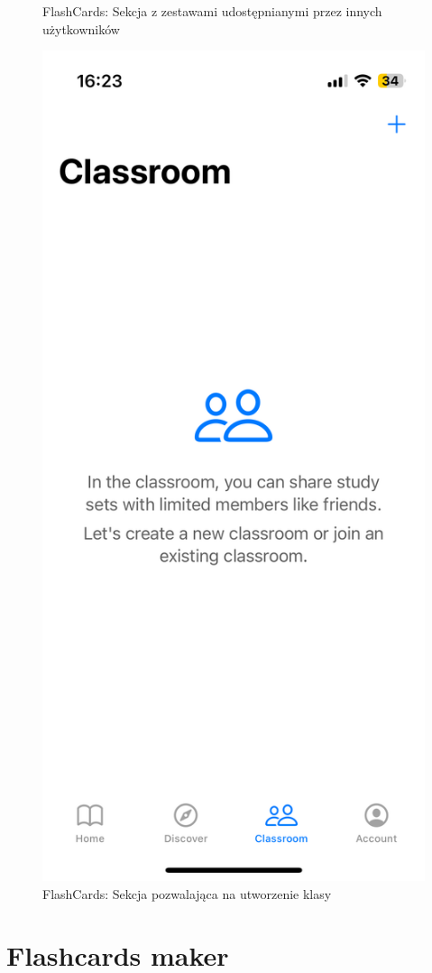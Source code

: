 \documentclass[final,a4paper,openany,12pt]{mwbk}
\begin{document}
\begin{figure}[H]
\begin{minipage}{0.5\textwidth}
  \caption{FlashCards: Sekcja z zestawami udostępnianymi przez innych użytkowników}
  \label{fig:flashcards3}
\end{minipage}%
\begin{minipage}{0.5\textwidth}
  \centering
  \includegraphics[width=.75\linewidth]{img/flashcards4.PNG}
  \caption{FlashCards: Sekcja pozwalająca na utworzenie klasy}
  \label{fig:flashcards4}
\end{minipage}
\end{figure}

\section{Flashcards maker}
\end{document}
